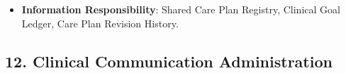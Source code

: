 \begin{itemize}
\begin{itemize}
\item 
\textbf{Capability-scoped behaviour: Care Plan Update Distribution} (Feature identity not established):


\begin{itemize}

\item 
\emph{Function}: \texttt{} — Broadcasts care plan updates to all enrolled care team participants.



\item 
\emph{Exposed Service}: \texttt{} — Emits care plan revision notices.



\end{itemize}


\end{itemize}


\item 
\textbf{Information Responsibility}: Shared Care Plan Registry, Clinical Goal Ledger, Care Plan Revision History.



\end{itemize}
\label{rad:sa:196}

\par\smallskip
{}\label{rad:sa:198}
\subsection*{12. Clinical Communication Administration}
\label{rad:sa:199}

